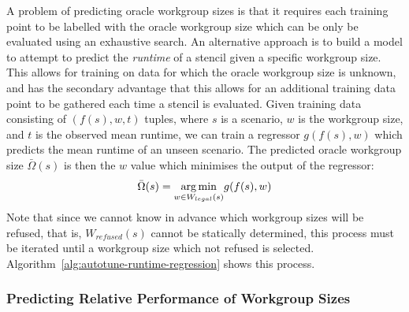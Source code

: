 \documentclass[prodmode,acmtecs]{acmsmall} %
\begin{document}
A problem of predicting oracle workgroup sizes is that it requires
each training point to be labelled with the oracle workgroup size
which can be only be evaluated using an exhaustive search. An
alternative approach is to build a model to attempt to predict the
\emph{runtime} of a stencil given a specific workgroup size. This
allows for training on data for which the oracle workgroup size is
unknown, and has the secondary advantage that this allows for an
additional training data point to be gathered each time a stencil is
evaluated. Given training data consisting of $(f(s),w,t)$ tuples,
where $s$ is a scenario, $w$ is the workgroup size, and $t$ is the
observed mean runtime, we can train a regressor $g(f(s), w)$ which
predicts the mean runtime of an unseen scenario. The predicted oracle
workgroup size $\bar{\Omega}(s)$ is then the $w$ value which minimises
the output of the regressor:
%
\begin{equation}
  \bar{\Omega}(s) = \underset{w \in W_{legal}(s)}{\operatorname*{arg\,min}} g(f(s), w)
\end{equation}
%
Note that since we cannot know in advance which workgroup sizes will
be refused, that is, $W_{refused}(s)$ cannot be statically determined,
this process must be iterated until a workgroup size which not refused
is selected. Algorithm~\ref{alg:autotune-runtime-regression} shows
this process.


\subsubsection{Predicting Relative Performance of Workgroup Sizes}


\end{document}

